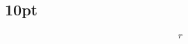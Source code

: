 \documentclass[12pt, table, a4paper,twoside]{exam}
\begin{document}
\begin{questions}
\begin{subparts}
\end{subparts}
\addpoints

\subsection{10pt}
\question[10] 

\begin{solution}[12em]
	\begin{align*}
	r
	\end{align*}
\end{solution}

\end{questions}
\end{document}
